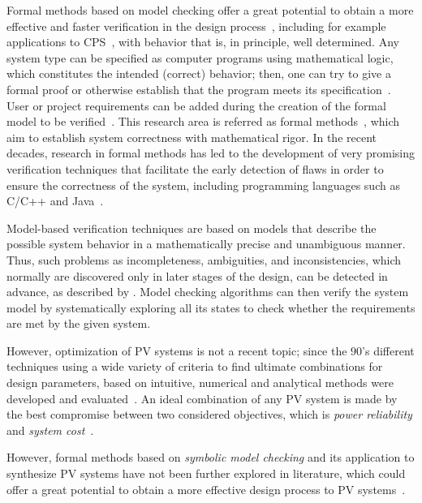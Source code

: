 Formal methods based on model checking offer a great potential to obtain a more effective and faster verification in the design process~\cite{ClarkeHV18}, including for example applications to CPS~\cite{Abateetal2017,AbateBCCDKK17,Bessa,ChavesBCKF17}, with behavior that is, in principle, well determined. 
Any system type can be specified as computer programs using mathematical logic, which constitutes the intended (correct) behavior; then, one can try to give a formal proof or otherwise establish that the program meets its specification~\cite{DBLP:journals/sttt/GadelhaIC17}. User or project requirements can be added during the creation of the formal model to be verified~\cite{Trindade,TrindadeDJISC17}. 
%
This research area is referred as formal methods~\cite{Clarkeetal}, which aim to establish system correctness with mathematical rigor. 
In the recent decades, research in formal methods has led to the development of very promising verification techniques that facilitate the early detection of flaws in order to ensure the correctness of the system, including programming languages such as C/C++ and Java~\cite{esbmc2018,RamalhoFSMC013,CordeiroKKST18}. 

Model-based verification techniques are based on models that describe the possible system behavior in a mathematically precise and unambiguous manner. Thus, such problems as incompleteness, ambiguities, and inconsistencies, which normally are discovered only in later stages of the design, can be detected in advance, as described by \cite{Trindade,TrindadeDJISC17}. 
Model checking algorithms can then verify the system model by systematically exploring all its states to check whether the requirements are met by the given system.
%
%

However, optimization of PV systems is not a recent topic; since the $90$'s different techniques using a wide variety of criteria to find ultimate combinations for design parameters, based on intuitive, numerical and analytical methods were developed and evaluated~\cite{Applasamy2011}. An ideal combination of any PV system is made by the best compromise between two considered objectives, which is \textit{power reliability} and \textit{system cost}~\cite{Alsadi2018}.
 
However, formal methods based on \textit{symbolic model checking} and its application 
to synthesize PV systems have not been further explored in literature, which could offer 
a great potential to obtain a more effective design process to PV systems~\cite{ClarkeHV18}.

